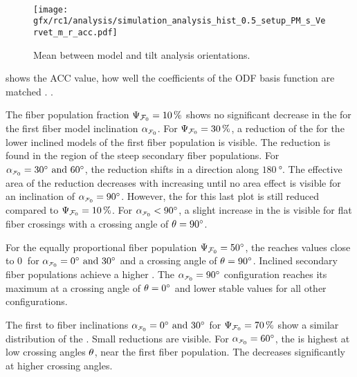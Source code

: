 \paragraph{\accvalue}
%
\begin{figure}[!p]
\centering
\texttt{[image: gfx/rc1/analysis/simulation\_analysis\_hist\_0.5\_setup\_PM\_s\_Vervet\_m\_r\_acc.pdf]}
\caption{Mean \accvalue{} between model and tilt analysis orientations.}
\label{fig:sim_ana_acc}
\end{figure}
% 
 shows the  \ac{ACC} value, \ie{} how well the coefficients of the \ac{ODF} basis function are matched \cite{Schilling2018}.
.
\par
% 
The fiber population fraction $\textnormal{$\Psi_{\textnormal{$\mathcal{F}_0$}}$}=\SI{10}{\percent}$ shows no significant decrease in the \accvalue{} for the first fiber model inclination $\modelInc$.
For $\textnormal{$\Psi_{\textnormal{$\mathcal{F}_0$}}$}=\SI{30}{\percent}$, a reduction of the \accvalue{} for the lower inclined models of the first fiber population is visible.
The reduction is found in the region of the steep secondary fiber populations.
For $\modelInc = \SIlist{30;60}{\degree}$, the reduction shifts in a direction along $\SI{180}{\degree}$.
The effective area of the reduction decreases with increasing \modelInc{} until no area effect is visible for an inclination of $\modelInc=\SI{90}{\degree}$.
However, the \accvalue{} for this last plot is still reduced compared to $\textnormal{$\Psi_{\textnormal{$\mathcal{F}_0$}}$}=\SI{10}{\percent}$.
For $\modelInc < \SI{90}{\degree}$, a slight increase in the \accvalue{} is visible for flat fiber crossings with a crossing angle of $\textnormal{$\theta$}=\SI{90}{\degree}$.
\par
%
For the equally proportional fiber population $\textnormal{$\Psi_{\textnormal{$\mathcal{F}_0$}}$} = \SI{50}{\degree}$, the \accvalue{} reaches values close to $\SI{0}{}$ for $\modelInc = \SIlist{0;30}{\degree}$ and a crossing angle of $\textnormal{$\theta$}=\SI{90}{\degree}$.
Inclined secondary fiber populations achieve a higher \accvalue{}.
The $\modelInc = \SI{90}{\degree}$ configuration reaches its maximum \accvalue{} at a crossing angle of $\textnormal{$\theta$}=\SI{0}{\degree}$ and lower stable values for all other configurations.
\par
%
The first to fiber inclinations $\modelInc = \SIlist{0;30}{\degree}$ for $\textnormal{$\Psi_{\textnormal{$\mathcal{F}_0$}}$}=\SI{70}{\percent}$ show a similar distribution of the \accvalue{}. 
Small reductions are visible.
For $\modelInc=\SI{60}{\degree}$, the \accvalue{} is highest at low crossing angles $\textnormal{$\theta$}$, \ie{} near the first fiber population.
The \accvalue{} decreases significantly at higher crossing angles.
